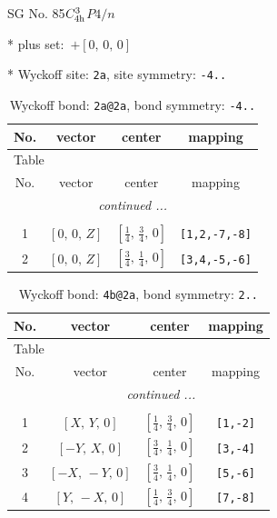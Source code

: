 \documentclass[fleqn,8pt]{jsarticle}
\begin{document}
\setcounter{MaxMatrixCols}{32}

\renewcommand{\tablename}{Table~}
\renewcommand{\figurename}{Figure~}
\begin{center}
\LARGE
SG No. 85\quad$C_{\rm 4h}^{3}$\quad$P4/n$\quad[ tetragonal ]
\end{center}

* plus set:\,\,\,$+\left[ 0,\, 0,\, 0 \right]$


* Wyckoff site: {\tt 2a}, site symmetry: {\tt -4..}
\renewcommand{\arraystretch}{1.2}
\begin{longtable}{cccc}
\caption{Wyckoff bond: {\tt 2a@2a}, bond symmetry: {\tt -4..}}
 \\
 \hline \hline
No. & vector & center & mapping \\ \hline \endfirsthead

\multicolumn{3}{l}{\tablename\ \thetable{}} \\
 \hline \hline
No. & vector & center & mapping \\ \hline \endhead

 \hline \hline
\multicolumn{3}{r}{\footnotesize\it continued ...} \\ \endfoot

 \hline \hline
\multicolumn{3}{r}{} \\ \endlastfoot

1 & $\left[ 0,\, 0,\, Z \right]$ & $\left[ \frac{1}{4},\, \frac{3}{4},\, 0 \right]$ & {\tt [1,2,-7,-8]} \\ \hline
2 & $\left[ 0,\, 0,\, Z \right]$ & $\left[ \frac{3}{4},\, \frac{1}{4},\, 0 \right]$ & {\tt [3,4,-5,-6]} \\
\end{longtable}
\renewcommand{\arraystretch}{1.2}
\begin{longtable}{cccc}
\caption{Wyckoff bond: {\tt 4b@2a}, bond symmetry: {\tt 2..}}
 \\
 \hline \hline
No. & vector & center & mapping \\ \hline \endfirsthead

\multicolumn{3}{l}{\tablename\ \thetable{}} \\
 \hline \hline
No. & vector & center & mapping \\ \hline \endhead

 \hline \hline
\multicolumn{3}{r}{\footnotesize\it continued ...} \\ \endfoot

 \hline \hline
\multicolumn{3}{r}{} \\ \endlastfoot

1 & $\left[ X,\, Y,\, 0 \right]$ & $\left[ \frac{1}{4},\, \frac{3}{4},\, 0 \right]$ & {\tt [1,-2]} \\ \hline
2 & $\left[ - Y,\, X,\, 0 \right]$ & $\left[ \frac{3}{4},\, \frac{1}{4},\, 0 \right]$ & {\tt [3,-4]} \\ \hline
3 & $\left[ - X,\, - Y,\, 0 \right]$ & $\left[ \frac{3}{4},\, \frac{1}{4},\, 0 \right]$ & {\tt [5,-6]} \\ \hline
4 & $\left[ Y,\, - X,\, 0 \right]$ & $\left[ \frac{1}{4},\, \frac{3}{4},\, 0 \right]$ & {\tt [7,-8]} \\
\end{longtable}
\end{document}
